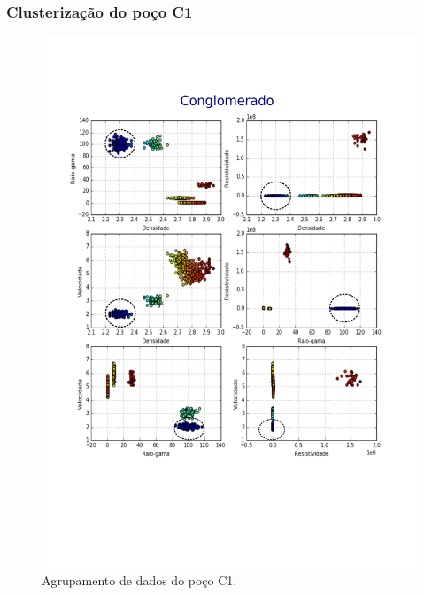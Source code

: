 \documentclass[aspectratio=10]{beamer} %
\begin{document}
\begin{frame}
\frametitle{Clusterização do poço C1}
\begin{figure}[H]
\centering
\includegraphics[scale=0.3]{Imagens/conglomeradoC1.png}
\caption{Agrupamento de dados do poço C1.}
\end{figure} 
\end{frame}
\end{document}
